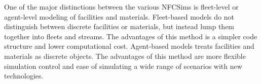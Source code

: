 \begin{table}[]
    \centering
    \caption{Nuclear Fuel Cycle Simulator Tools and their corresponding organizations.}
    \label{tab:nfctools}
    \end{table}

One of the major distinctions between the various \glspl{NFCSim}
is fleet-level or agent-level modeling of facilities and materials. 
Fleet-based models do not distinguish between discrete facilities 
or materials, but instead lump them together into fleets and streams. 
The advantages of this method is a simpler code structure and 
lower computational cost. 
Agent-based models treats facilities and materials as discrete 
objects. 
The advantages of this method are more flexible simulation control
and ease of simulating a wide range of scenarios with new 
technologies.  

